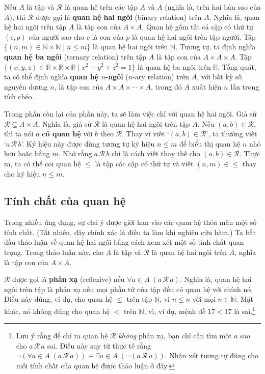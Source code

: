 Nếu $A$ là tập và $\mathcal{R}$ là quan hệ trên các tập $A$ và $A$ (nghĩa là, trên hai bản sao của $A$), thì $\mathcal{R}$ được gọi là \textbf{quan hệ hai ngôi} (binary relation) trên $A$. Nghĩa là, quan hệ hai ngôi trên tập $A$ là tập con của $A \times A$. Quan hệ gồm tất cả cặp có thứ tự $(c,p)$ của người sao cho $c$ là con của $p$ là quan hệ hai ngôi trên tập người. Tập $\{(n,m) \in \mathbb{N} \times \mathbb{N} \mid n \le m\}$ là quan hệ hai ngôi trên $\mathbb{N}$. Tương tự, ta định nghĩa \textbf{quan hệ ba ngôi} (ternary relation) trên tập $A$ là tập con của $A \times A \times A$. Tập $\{(x,y,z) \in \mathbb{R} \times \mathbb{R} \times \mathbb{R} \mid x^2 + y^2 + z^2 = 1\}$ là quan hệ ba ngôi trên $\mathbb{R}$. Tổng quát, ta có thể định nghĩa \textbf{quan hệ $n$-ngôi} ($n$-ary relation) trên $A$, với bất kỳ số nguyên dương $n$, là tập con của $A \times A \times \cdots \times A$, trong đó $A$ xuất hiện $n$ lần trong tích chéo.

Trong phần còn lại của phần này, ta sẽ làm việc chỉ với quan hệ hai ngôi. Giả sử $\mathcal{R} \subseteq A \times A$. Nghĩa là, giả sử $\mathcal{R}$ là quan hệ hai ngôi trên tập $A$. Nếu $(a,b) \in \mathcal{R}$, thì ta nói $a$ \textbf{có quan hệ} với $b$ theo $\mathcal{R}$. Thay vì viết `$(a,b) \in \mathcal{R}$', ta thường viết `$a\,\mathcal{R}\,b$'. Ký hiệu này được dùng tương tự ký hiệu $n \le m$ để biểu thị quan hệ $n$ nhỏ hơn hoặc bằng $m$. Nhớ rằng $a\,\mathcal{R}\,b$ chỉ là cách viết thay thế cho $(a,b) \in \mathcal{R}$. Thực ra, ta có thể coi quan hệ $\le$ là tập các cặp có thứ tự và viết $(n,m) \in {\le}$ thay cho ký hiệu $n \le m$.

\subsection{Tính chất của quan hệ}

Trong nhiều ứng dụng, sự chú ý được giới hạn vào các quan hệ thỏa mãn một số tính chất. (Tất nhiên, đây chính xác là điều ta làm khi nghiên cứu hàm.) Ta bắt đầu thảo luận về quan hệ hai ngôi bằng cách xem xét một số tính chất quan trọng. Trong thảo luận này, cho $A$ là tập và $\mathcal{R}$ là quan hệ hai ngôi trên $A$, nghĩa là tập con của $A \times A$.

$\mathcal{R}$ được gọi là \textbf{phản xạ} (reflexive) nếu $\forall a \in A\; (a\,\mathcal{R}\,a)$. Nghĩa là, quan hệ hai ngôi trên tập là phản xạ nếu mọi phần tử của tập đều có quan hệ với chính nó. Điều này đúng, ví dụ, cho quan hệ $\le$ trên tập $\mathbb{N}$, vì $n \le n$ với mọi $n \in \mathbb{N}$. Mặt khác, nó không đúng cho quan hệ $<$ trên $\mathbb{N}$, vì, ví dụ, mệnh đề $17 < 17$ là sai.\footnote{Lưu ý rằng để chỉ ra quan hệ $\mathcal{R}$ \emph{không} phản xạ, bạn chỉ cần tìm một $a$ sao cho $a\,\mathcal{R}\,a$ sai. Điều này suy từ thực tế rằng $\neg(\forall a \in A\; (a\,\mathcal{R}\,a)) \equiv \exists a \in A\; (\neg(a\,\mathcal{R}\,a))$. Nhận xét tương tự đúng cho mỗi tính chất của quan hệ được thảo luận ở đây.}

